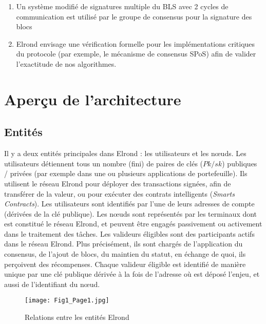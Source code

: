 \documentclass[journal]{IEEEtran}
\begin{document}
\begin{enumerate}
  \item  Un système modifié de signatures multiple du BLS \cite{5} avec 2 cycles de communication est utilisé par le groupe de consensus pour la signature des blocs
  \item Elrond envisage une vérification formelle pour les implémentations critiques du protocole (par exemple, le mécanisme de consensus SPoS) afin de valider l’exactitude de nos algorithmes. 
\end{enumerate}


\section{Aperçu de l'architecture}\label{Archi}

\subsection{Entités} 
\label{Archi1}
Il y a deux entités principales dans Elrond : les utilisateurs et les nœuds. Les utilisateurs détiennent tous un nombre (fini) de paires de clés ($Pk/sk$) publiques / privées (par exemple dans une ou plusieurs applications de portefeuille). Ils utilisent le réseau Elrond pour déployer des transactions signées, afin de transférer de la valeur, ou pour exécuter des contrats intelligents (\textit{Smarts Contracts}). Les utilisateurs sont identifiés par l'une de leurs adresses de compte (dérivées de la clé publique). Les nœuds sont représentés par les terminaux dont est constitué le réseau Elrond, et peuvent être engagés passivement ou activement dans le traitement des tâches. Les valideurs éligibles sont des participants actifs dans le réseau Elrond. Plus précisément, ils sont chargés de l’application du consensus, de l'ajout de blocs, du maintien du statut, en échange de quoi, ils perçoivent des récompenses. Chaque valideur éligible est identifié de manière unique par une clé publique dérivée à la fois de l'adresse où est déposé l’enjeu, et aussi de l'identifiant du nœud.

\begin{figure}
	\texttt{[image: Fig1\_Page1.jpg]} %
	\caption{Relations entre les entités Elrond} %
	\label{Fig.1} %
\end{figure}
\end{document}
